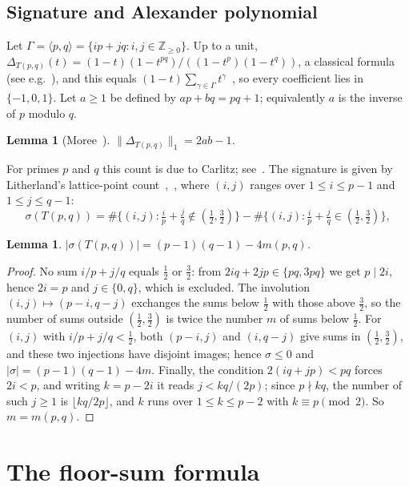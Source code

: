 \documentclass[11pt,reqno]{amsart}
\theoremstyle{plain}
\newtheorem{lemma}[theorem]{Lemma}
\theoremstyle{definition}
\newcommand{\Z}{\mathbb{Z}}
\begin{document}
\subsection{Signature and Alexander polynomial}
Let $\Gamma=\langle p,q\rangle=\{ip+jq:i,j\in\Z_{\ge0}\}$. Up to a unit,
$\Delta_{T(p,q)}(t)=(1-t)(1-t^{pq})/((1-t^p)(1-t^q))$, a classical formula (see
e.g.~\cite[\S9.6]{DSEquiv}), and this equals $(1-t)\sum_{\gamma\in\Gamma}t^\gamma$~\cite[Thm.~1]{Moree}, so
every coefficient lies in $\{-1,0,1\}$. Let $a\ge1$ be defined by $ap+bq=pq+1$; equivalently $a$ is the
inverse of $p$ modulo $q$.

\begin{lemma}[Moree~{\cite[Lemma~1, Cor.~1]{Moree}}]\label{lem:moree}
$\|\Delta_{T(p,q)}\|_1=2ab-1$.
\end{lemma}

For primes $p$ and $q$ this count is due to Carlitz; see~\cite{Moree}. The signature is given by
Litherland's lattice-point count~\cite{Litherland},~\cite[Prop.~1.1]{BO}, where $(i,j)$ ranges over
$1\le i\le p-1$ and $1\le j\le q-1$:
\[
\sigma(T(p,q))=\#\bigl\{(i,j)\colon \tfrac ip+\tfrac jq\notin(\tfrac12,\tfrac32)\bigr\}
-\#\bigl\{(i,j)\colon \tfrac ip+\tfrac jq\in(\tfrac12,\tfrac32)\bigr\},
\]

\begin{lemma}\label{lem:sigma}
$|\sigma(T(p,q))|=(p-1)(q-1)-4m(p,q)$.
\end{lemma}

\begin{proof}
No sum $i/p+j/q$ equals $\frac12$ or $\frac32$: from $2iq+2jp\in\{pq,3pq\}$ we get $p\mid 2i$, hence
$2i=p$ and $j\in\{0,q\}$, which is excluded. The involution $(i,j)\mapsto(p-i,q-j)$ exchanges the sums
below $\frac12$ with those above $\frac32$, so the number of sums outside $(\frac12,\frac32)$ is twice the
number $m$ of sums below $\frac12$. For $(i,j)$ with $i/p+j/q<\frac12$, both $(p-i,j)$ and $(i,q-j)$ give
sums in $(\frac12,\frac32)$, and these two injections have disjoint images; hence $\sigma\le0$ and
$|\sigma|=(p-1)(q-1)-4m$. Finally, the condition $2(iq+jp)<pq$ forces $2i<p$, and writing $k=p-2i$ it
reads $j<kq/(2p)$; since $p\nmid kq$, the number of such $j\ge1$ is $\lfloor kq/2p\rfloor$, and $k$ runs
over $1\le k\le p-2$ with $k\equiv p\pmod2$. So $m=m(p,q)$.
\end{proof}

\section{The floor-sum formula}\label{sec:formula}
\end{document}
